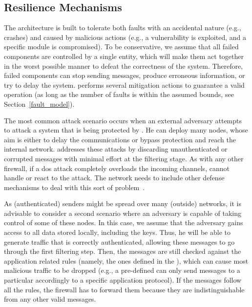 \subsection{Resilience Mechanisms}


The \sieveq architecture is built to tolerate both faults with an accidental nature (e.g., crashes) and caused by malicious actions (e.g., a vulnerability is exploited, and a specific module is compromised).
To be conservative, we assume that all failed components are controlled by a single entity, which will make them act together in the worst possible manner to defeat the correctness of the system. Therefore, failed components can stop sending messages, produce erroneous information, or try to delay the system. 
\sieveq performs several mitigation actions to guarantee a valid operation (as long as the number of faults is within the assumed bounds, see Section~\ref{fault_model}).



The most common attack scenario occurs when an external adversary attempts to attack a system that is being protected by \sieveq. 
He can deploy many nodes, whose aim is either to delay the communications or bypass \sieveq protection and reach the internal network. \sieveq addresses these attacks by discarding unauthenticated or corrupted messages with minimal effort at the \presieve filtering stage.
As with any other firewall, if a \gls{dos} attack completely overloads the incoming channels, \sieveq cannot handle or react to the attack.
The network needs to include other defense mechanisms to deal with this sort of problem~\cite{Mishra:2011}.

As (authenticated) senders might be spread over many (outside) networks, it is advisable to consider a second scenario where an adversary is capable of taking control of some of these nodes. 
In this case, we assume that the adversary gains access to all data stored locally, including the \sender keys. 
Thus, he will be able to generate traffic that is correctly authenticated, allowing these messages to go through the first filtering step.
Then, the messages are still checked against the application related rules (namely, the ones defined in the \repsieve), which can cause most malicious traffic to be dropped (e.g., a pre-defined \sender can only send messages to a particular \postsieve accordingly to a specific application protocol).
If the messages follow all the rules, the firewall has to forward them because they are indistinguishable from any other valid messages.


